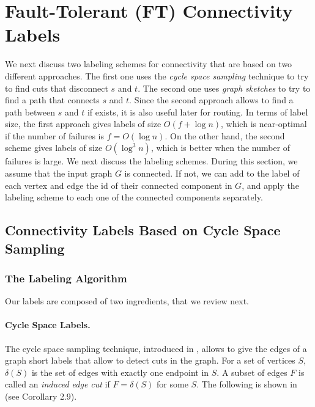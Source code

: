 \section{Fault-Tolerant (FT) Connectivity Labels}


We next discuss two labeling schemes for connectivity that are based on two different approaches. The first one uses the \emph{cycle space sampling} technique to try to find cuts that disconnect $s$ and $t$. The second one uses \emph{graph sketches} to try to find a path that connects $s$ and $t$. Since the second approach allows to find a path between $s$ and $t$ if exists, it is also useful later for routing. In terms of label size, the first approach gives labels of size $O(f + \log{n})$, which is near-optimal if the number of failures is $f=O(\log{n})$. On the other hand, the second scheme gives labels of size $O(\log^3{n})$, which is better when the number of failures is large.
We next discuss the labeling schemes. During this section, we assume that the input graph $G$ is connected. If not, we can add to the label of each vertex and edge the id of their connected component in $G$, and apply the labeling scheme to each one of the connected components separately. 

\subsection{Connectivity Labels Based on Cycle Space Sampling}

\subsubsection{The Labeling Algorithm}

Our labels are composed of two ingredients, that we review next.

\paragraph{Cycle Space Labels.}
The cycle space sampling technique, introduced in \cite{pritchard2011fast}, allows to give the edges of a graph short labels that allow to detect cuts in the graph. For a set of vertices $S$, $\delta(S)$ is the set of edges with exactly one endpoint in $S$. A subset of edges $F$ is called an \emph{induced edge cut} if $F = \delta(S)$ for some $S$.
The following is shown in \cite{pritchard2011fast} (see Corollary 2.9). 

